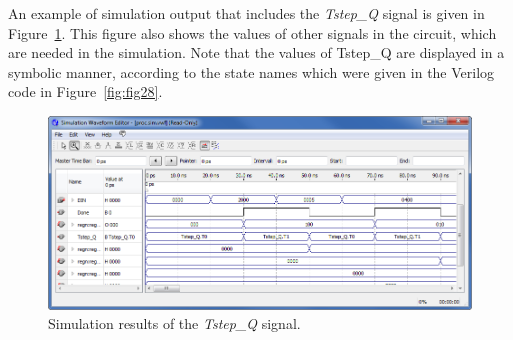 \documentclass[11pt, twoside, pdftex]{article}
\newcommand{\commonPath}{../../../../Common}
\begin{document}
An example of simulation output that includes the {\it Tstep\_Q} signal is given in Figure~\ref{fig:fig30}.
This figure also shows the values of other signals in the circuit, which are needed in the simulation. 
Note that the values of Tstep\_Q are displayed in a symbolic manner, according to the state names which were 
given in the Verilog code in Figure~\ref{fig:fig28}.
\begin{figure}[H]
   \begin{center}
      \includegraphics[scale=0.65]{figures/appendix/figure30.png}
   \caption{Simulation results of the {\it Tstep\_Q} signal.} 
	 \label{fig:fig30}
	 \end{center}
\end{figure} 	

\fi




\end{document}

